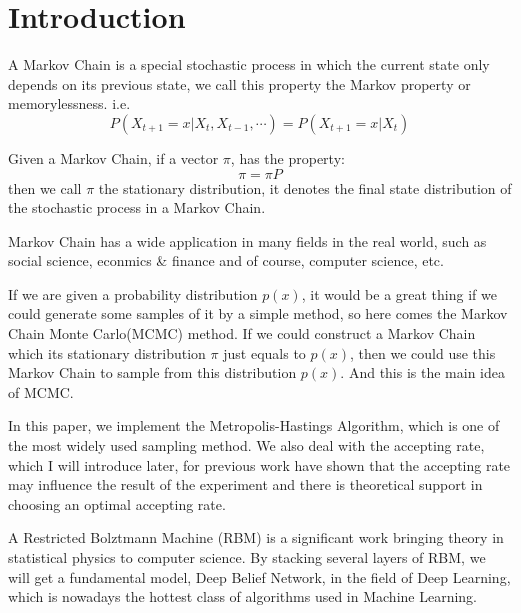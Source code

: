 


\section{Introduction} \label{sec:introduction}

A Markov Chain is a special stochastic process in which the current state only depends on its previous state, we call this property the Markov property or memorylessness. i.e.
\begin{equation}
P(X_{t+1}=x|X_t, X_{t-1}, \cdots) =P(X_{t+1}=x|X_t)
\end{equation}

Given a Markov Chain, if a vector $\pi$, has the property:
\begin{equation}
\pi=\pi P
\end{equation}
then we call $\pi$ the stationary distribution, it denotes the final state distribution of the stochastic process in a Markov Chain.

Markov Chain has a wide application in many fields in the real world, such as social science\cite{acemoglu2011political}, econmics \& finance\cite{hamilton1989new} and of course, computer science\cite{page1999pagerank}, etc.

If we are given a probability distribution $p(x)$, it would be a great thing if we could generate some samples of it by a simple method, so here comes the Markov Chain Monte Carlo(MCMC) method. If we could construct a Markov Chain which its stationary distribution $\pi$ just equals to $p(x)$, then we could use this Markov Chain to sample from this distribution $p(x)$. And this is the main idea of MCMC.

In this paper, we implement the Metropolis-Hastings Algorithm\cite{metropolis1953equation,hastings1970monte}, which is one of the most widely used sampling method. We also deal with the accepting rate, which I will introduce later, for previous work\cite{roberts1997weak} have shown that the accepting rate may influence the result of the experiment and there is theoretical support in choosing an optimal accepting rate.

A Restricted Bolztmann Machine (RBM)\cite{mcclelland1987parallel} is a significant work bringing theory in statistical physics to computer science. By stacking several layers of RBM, we will get a fundamental model, Deep Belief Network\cite{hinton2006reducing}, in the field of Deep Learning, which is nowadays the hottest class of algorithms used in Machine Learning.

